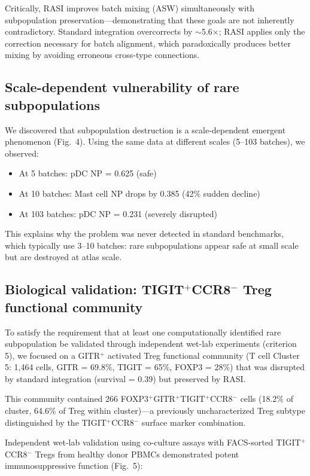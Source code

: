 \documentclass[10pt]{article}
\begin{document}
Critically, RASI improves batch mixing (ASW) simultaneously with subpopulation preservation---demonstrating that these goals are not inherently contradictory. Standard integration overcorrects by $\sim$5.6$\times$; RASI applies only the correction necessary for batch alignment, which paradoxically produces better mixing by avoiding erroneous cross-type connections.

\subsection{Scale-dependent vulnerability of rare subpopulations}

We discovered that subpopulation destruction is a scale-dependent emergent phenomenon (Fig.~4). Using the same data at different scales (5--103 batches), we observed:

\begin{itemize}
\item At 5 batches: pDC NP = 0.625 (safe)
\item At 10 batches: Mast cell NP drops by 0.385 (42\% sudden decline)
\item At 103 batches: pDC NP = 0.231 (severely disrupted)
\end{itemize}

This explains why the problem was never detected in standard benchmarks, which typically use 3--10 batches: rare subpopulations appear safe at small scale but are destroyed at atlas scale.

\subsection{Biological validation: TIGIT$^+$CCR8$^-$ Treg functional community}

To satisfy the requirement that at least one computationally identified rare subpopulation be validated through independent wet-lab experiments (criterion 5), we focused on a GITR$^+$ activated Treg functional community (T cell Cluster 5: 1,464 cells, GITR = 69.8\%, TIGIT = 65\%, FOXP3 = 28\%) that was disrupted by standard integration (survival = 0.39) but preserved by RASI.

This community contained 266 FOXP3$^+$GITR$^+$TIGIT$^+$CCR8$^-$ cells (18.2\% of cluster, 64.6\% of Treg within cluster)---a previously uncharacterized Treg subtype distinguished by the TIGIT$^+$CCR8$^-$ surface marker combination.

Independent wet-lab validation using co-culture assays with FACS-sorted TIGIT$^+$CCR8$^-$ Tregs from healthy donor PBMCs demonstrated potent immunosuppressive function (Fig.~5):
\end{document}
